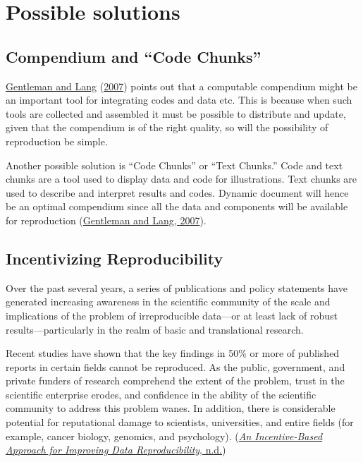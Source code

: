 \documentclass[
  11pt,
]{article}
\begin{document}
\hypertarget{possible-solutions}{%
\section{Possible solutions}\label{possible-solutions}}

\hypertarget{compendium-and-code-chunks}{%
\subsection{Compendium and ``Code
Chunks''}\label{compendium-and-code-chunks}}

\protect\hyperlink{ref-gentleman2007}{Gentleman and Lang}
(\protect\hyperlink{ref-gentleman2007}{2007}) points out that a
computable compendium might be an important tool for integrating codes
and data etc. This is because when such tools are collected and
assembled it must be possible to distribute and update, given that the
compendium is of the right quality, so will the possibility of
reproduction be simple.

Another possible solution is ``Code Chunks'' or ``Text Chunks.'' Code
and text chunks are a tool used to display data and code for
illustrations. Text chunks are used to describe and interpret results
and codes. Dynamic document will hence be an optimal compendium since
all the data and components will be available for reproduction
(\protect\hyperlink{ref-gentleman2007}{Gentleman and Lang, 2007}).

\hypertarget{incentivizing-reproducibility}{%
\subsection{Incentivizing
Reproducibility}\label{incentivizing-reproducibility}}

Over the past several years, a series of publications and policy
statements have generated increasing awareness in the scientific
community of the scale and implications of the problem of irreproducible
data---or at least lack of robust results---particularly in the realm of
basic and translational research.

Recent studies have shown that the key findings in 50\% or more of
published reports in certain fields cannot be reproduced. As the public,
government, and private funders of research comprehend the extent of the
problem, trust in the scientific enterprise erodes, and confidence in
the ability of the scientific community to address this problem wanes.
In addition, there is considerable potential for reputational damage to
scientists, universities, and entire fields (for example, cancer
biology, genomics, and psychology).
(\protect\hyperlink{ref-Science.org}{\emph{An Incentive-Based Approach
for Improving Data Reproducibility}, n.d.})
\end{document}
